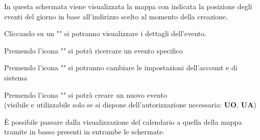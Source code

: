 \documentclass{article}
\begin{document}
\begin{description}
\begin{center}
          \end{center}
    \item[] In questa schermata viene visualizzata la mappa con indicata la posizione degli eventi del giorno in base all'indirizzo scelto al momento della creazione.
    \item[] Cliccando su un "" si potranno visualizzare i dettagli dell'evento.
    \item[] Premendo l'icona "" si potrà ricercare un evento specifico
    \item[] Premendo l'icona "" si potranno cambiare le impostazioni dell'account e di sistema
    \item[] Premendo l'icona "" si potrà creare un nuovo evento \\ (visibile e utilizzabile solo se si dispone dell'autorizzazione necessaria: \textbf{UO}, \textbf{UA})
    \item[] È possibile passare dalla visualizzazione del calendario a quella della mappa tramite in basso presenti in entrambe le schermate.
\end{description}
\clearpage
\end{document}
